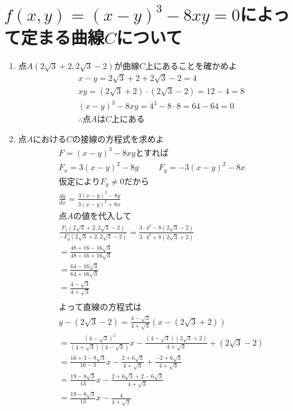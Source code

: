 \documentclass[a4paper,10pt]{jarticle}
\begin{document}
\section{$f(x,y) = (x-y)^3-8xy=0$によって定まる曲線$C$について}
\begin{enumerate}
\item 点$A(2\sqrt{3}+2,2\sqrt{3}-2)$が曲線$C$上にあることを確かめよ\begin{gather*}
	x-y=2\sqrt{3}+2 + 2\sqrt{3}-2 = 4\\
	xy = (2\sqrt{3}+2) \cdot (2\sqrt{3}-2) = 12 - 4 = 8\\
	(x-y)^3-8xy = 4^3 - 8 \cdot 8 = 64 - 64 = 0 \\
	\therefore \text{点}A\text{は}C\text{上にある}
\end{gather*}
\item 点$A$における$C$の接線の方程式を求めよ\begin{gather*}
	F = (x-y)^3-8xy\text{とすれば}\\
	F_x = 3(x-y)^2-8y \hspace{1cm} F_y= -3(x-y)^2-8x \\
	\text{仮定により}F_y \neq 0 \text{だから} \\
	\frac{dy}{dx} = \frac{3(x-y)^2-8y}{3(x-y)^2+8x}\\
	\text{点$A$の値を代入して} \\
	\frac{F_x(2\sqrt{3}+2,2\sqrt{3}-2)}{-F_y(2\sqrt{3}+2,2\sqrt{3}-2)}
		=\frac{3 \cdot 4^2 - 8(2\sqrt{3}-2)}{3 \cdot 4^2 + 8(2\sqrt{3}+2)} \\
	=\frac{48+16-16\sqrt{3}}{48+16+16\sqrt{3}} \\
	=\frac{64-16\sqrt{3}}{64+16\sqrt{3}} \\
	=\frac{4-\sqrt{3}}{4+\sqrt{3}}\\\\
	\text{よって直線の方程式は}\\
	y - (2\sqrt{3}-2) = \frac{4-\sqrt{3}}{4+\sqrt{3}} (x - (2\sqrt{3}+2))\\
	= \frac{(4-\sqrt{3})^2}{(4+\sqrt{3})(4-\sqrt{3})}x-\frac{(4-\sqrt{3})(2\sqrt{3}+2)}{4+\sqrt{3}}+(2\sqrt{3}-2)\\
	= \frac{16+3-8\sqrt{3}}{16-3}x-\frac{2+6\sqrt{3}}{4+\sqrt{3}}+\frac{-2+6\sqrt{3}}{4+\sqrt{3}}\\
	=\frac{19-8\sqrt{3}}{13}x-\frac{2+6\sqrt{3}+2-6\sqrt{3}}{4+\sqrt{3}}\\
	=\frac{19-8\sqrt{3}}{13}x-\frac{4}{4+\sqrt{3}}
\end{gather*}
\end{enumerate}
\end{document}
